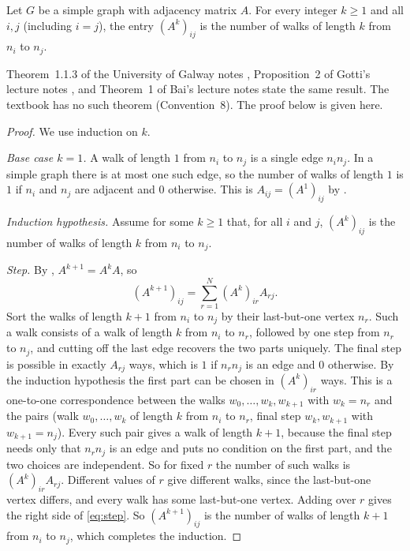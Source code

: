 \begin{theorem}\label{thm:walkcount}
Let $G$ be a simple graph with adjacency matrix $A$. For every integer $k\ge 1$ and all $i,j$ (including $i=j$), the entry $(A^k)_{ij}$ is the number of walks of length $k$ from $n_i$ to $n_j$.
\end{theorem}
Theorem~1.1.3 of the University of Galway notes \cite[p.~4]{uogalway_adjacency_notes}, Proposition~2 of Gotti's lecture notes \cite[p.~1]{gotti_mit18211_lec27}, and Theorem~1 of Bai's lecture notes \cite[p.~1]{bai2025adjacency} state the same result. The textbook has no such theorem (Convention~8). The proof below is given here.
\begin{proof}
We use induction on $k$.

\emph{Base case $k=1$.} A walk of length $1$ from $n_i$ to $n_j$ is a single edge $n_in_j$. In a simple graph there is at most one such edge, so the number of walks of length $1$ is $1$ if $n_i$ and $n_j$ are adjacent and $0$ otherwise. This is $A_{ij}=(A^1)_{ij}$ by .

\emph{Induction hypothesis.} Assume for some $k\ge 1$ that, for all $i$ and $j$, $(A^k)_{ij}$ is the number of walks of length $k$ from $n_i$ to $n_j$.

\emph{Step.} By , $A^{k+1}=A^kA$, so
\begin{equation}\label{eq:step}
(A^{k+1})_{ij}=\sum_{r=1}^{N}(A^k)_{ir}A_{rj}.
\end{equation}
Sort the walks of length $k+1$ from $n_i$ to $n_j$ by their last-but-one vertex $n_r$. Such a walk consists of a walk of length $k$ from $n_i$ to $n_r$, followed by one step from $n_r$ to $n_j$, and cutting off the last edge recovers the two parts uniquely. The final step is possible in exactly $A_{rj}$ ways, which is $1$ if $n_rn_j$ is an edge and $0$ otherwise. By the induction hypothesis the first part can be chosen in $(A^k)_{ir}$ ways. This is a one-to-one correspondence between the walks $w_0,\dots,w_k,w_{k+1}$ with $w_k=n_r$ and the pairs (walk $w_0,\dots,w_k$ of length $k$ from $n_i$ to $n_r$, final step $w_k,w_{k+1}$ with $w_{k+1}=n_j$). Every such pair gives a walk of length $k+1$, because the final step needs only that $n_rn_j$ is an edge and puts no condition on the first part, and the two choices are independent. So for fixed $r$ the number of such walks is $(A^k)_{ir}A_{rj}$. Different values of $r$ give different walks, since the last-but-one vertex differs, and every walk has some last-but-one vertex. Adding over $r$ gives the right side of \eqref{eq:step}. So $(A^{k+1})_{ij}$ is the number of walks of length $k+1$ from $n_i$ to $n_j$, which completes the induction.
\end{proof}

